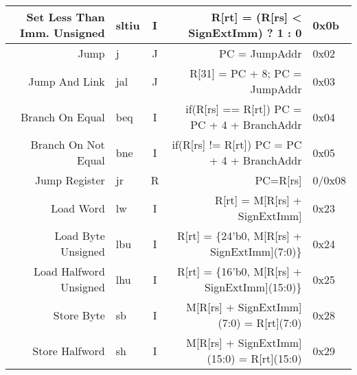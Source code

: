 \begin{tabularx}{\textwidth}{NMcDO}
    Set Less Than Imm. Unsigned                         & sltiu                                    & I & R[rt] = (R[rs] < SignExtImm) ? 1 : 0                             \footnotemark[2]\footnotemark[6] & 0x0b   \\
    \midrule
    Jump                                                & j                                        & J & PC = JumpAddr                                                      \footnotemark[5]               & 0x02   \\
    Jump And Link                                       & jal                                      & J & R[31] = PC + 8; PC = JumpAddr                                          \footnotemark[5]           & 0x03   \\
    Branch On Equal                                     & beq                                      & I & if(R[rs] == R[rt]) PC = PC + 4 + BranchAddr                      \footnotemark[4]                 & 0x04   \\
    Branch On Not Equal                                 & bne                                      & I & if(R[rs] != R[rt]) PC = PC + 4 + BranchAddr                      \footnotemark[4]                 & 0x05   \\
    Jump Register                                       & jr                                       & R & PC=R[rs]                                                                                          & 0/0x08 \\
    \midrule
    Load Word                                           & lw                                       & I & R[rt] = M[R[rs] + SignExtImm]                                    \footnotemark[2]                 & 0x23   \\
    Load Byte Unsigned                                  & lbu                                      & I & R[rt] = \{24'b0, M[R[rs] + SignExtImm](7:0)\}                    \footnotemark[2]                 & 0x24   \\
    Load Halfword Unsigned                              & lhu                                      & I & R[rt] = \{16'b0, M[R[rs] + SignExtImm](15:0)\}                   \footnotemark[2]                 & 0x25   \\
    Store Byte                                          & sb                                       & I & M[R[rs] + SignExtImm](7:0) = R[rt](7:0)                          \footnotemark[2]                 & 0x28   \\
    Store Halfword                                      & sh                                       & I & M[R[rs] + SignExtImm](15:0) = R[rt](15:0)                        \footnotemark[2]                 & 0x29   \\

\end{tabularx}
